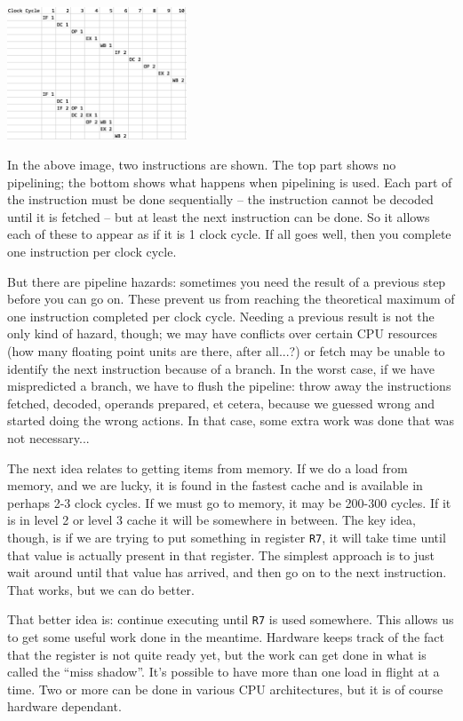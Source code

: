 \documentclass[a4paper]{report}
\begin{document}
\begin{center}
\includegraphics[width=0.4\textwidth]{images/pipelining}
\end{center}

In the above image, two instructions are shown. The top part shows no pipelining; the bottom shows what happens when pipelining is used. Each part of the instruction must be done sequentially -- the instruction cannot be decoded until it is fetched -- but at least the next instruction can be done. So it allows each of these to appear as if it is 1 clock cycle. If all goes well, then you complete one instruction per clock cycle. 

But there are pipeline hazards: sometimes you need the result of a previous step before you can go on. These prevent us from reaching the theoretical maximum of one instruction completed per clock cycle. Needing a previous result is not the only kind of hazard, though; we may have conflicts over certain CPU resources (how many floating point units are there, after all...?) or fetch may be unable to identify the next instruction because of a branch. In the worst case, if we have mispredicted a branch, we have to flush the pipeline: throw away the instructions fetched, decoded, operands prepared, et cetera, because we guessed wrong and started doing the wrong actions. In that case, some extra work was done that was not necessary... 

The next idea relates to getting items from memory. If we do a load from memory, and we are lucky, it is found in the fastest cache and is available in perhaps 2-3 clock cycles. If we must go to memory, it may be 200-300 cycles. If it is in level 2 or level 3 cache it will be somewhere in between. The key idea, though, is if we are trying to put something in register \texttt{R7}, it will take time until that value is actually present in that register. The simplest approach is to just wait around until that value has arrived, and then go on to the next instruction. That works, but we can do better.

That better idea is: continue executing until \texttt{R7} is used somewhere. This allows us to get some useful work done in the meantime. Hardware keeps track of the fact that the register is not quite ready yet, but the work can get done in what is called the ``miss shadow''. It's possible to have more than one load in flight at a time. Two or more can be done in various CPU architectures, but it is of course hardware dependant. 
\end{document}

